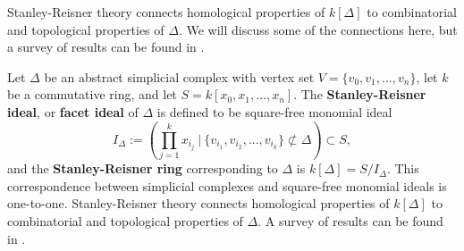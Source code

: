 \documentclass[12pt,leqno]{amsart}
\theoremstyle{definition}
\begin{document}
\noindent
Stanley-Reisner theory connects homological properties of $k[\Delta]$ to combinatorial and topological properties of $\Delta$. We will discuss some of the connections here, but a survey of results can be found in \cites{BH, Stanley, MS}.

Let $\Delta$ be an abstract simplicial complex with vertex set $V = \{v_0,v_1,...,v_n\}$, let $k$ be a commutative ring, and let $S = k[x_0,x_1,...,x_n]$. The \textbf{Stanley-Reisner ideal}, or \textbf{facet ideal} of $\Delta$ is defined to be square-free monomial ideal
%
\begin{displaymath}
  I_\Delta := \left( \prod_{j=1}^k x_{i_j} \ \bigg\vert \ \{ v_{i_1},v_{i_2},...,v_{i_k} \} \not \subset \Delta \right) \subset S,
\end{displaymath}
%
and the \textbf{Stanley-Reisner ring} corresponding to $\Delta$ is $k[\Delta] = S/I_\Delta$. This correspondence between simplicial complexes and square-free monomial ideals is one-to-one. Stanley-Reisner theory connects homological properties of $k[\Delta]$ to combinatorial and topological properties of $\Delta$. A survey of results can be found in \cite{BH, Stanley, MS}.
\end{document}

